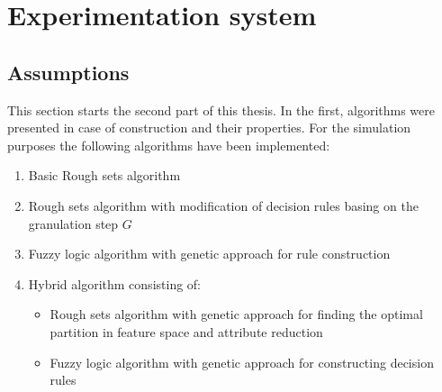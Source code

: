 \section{Experimentation system}
\label{cha:ExperimentAnalysis}
\subsection{Assumptions}
This section starts the second part of this thesis. In the first, algorithms
were presented in case of construction and their properties. For the simulation 
purposes the following algorithms have been implemented:
\begin{enumerate}
    \item Basic Rough sets algorithm
    \item Rough sets algorithm with modification of decision rules basing on
        the granulation step $G$
    \item Fuzzy logic algorithm with genetic approach for rule construction
    \item Hybrid algorithm consisting of:
        \begin{itemize}
            \item Rough sets algorithm with genetic approach for finding the
                optimal partition in feature space and attribute reduction 
            \item Fuzzy logic algorithm with genetic approach for constructing
                decision rules
        \end{itemize}
\end{enumerate}

